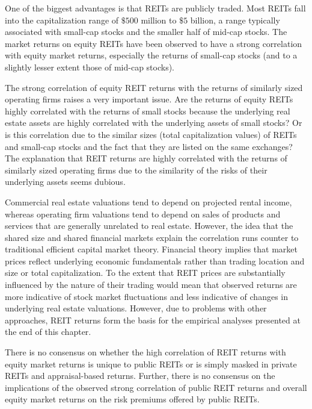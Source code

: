 \documentclass[11pt]{article}
\begin{document}
One of the biggest advantages is that REITs are publicly traded. Most REITs fall into the capitalization range of $\$ 500$ million to $\$ 5$ billion, a range typically associated with small-cap stocks and the smaller half of mid-cap stocks. The market returns on equity REITs have been observed to have a strong correlation with equity market returns, especially the returns of small-cap stocks (and to a slightly lesser extent those of mid-cap stocks).

The strong correlation of equity REIT returns with the returns of similarly sized operating firms raises a very important issue. Are the returns of equity REITs highly correlated with the returns of small stocks because the underlying real estate assets are highly correlated with the underlying assets of small stocks? Or is this correlation due to the similar sizes (total capitalization values) of REITs and small-cap stocks and the fact that they are listed on the same exchanges? The explanation that REIT returns are highly correlated with the returns of similarly sized operating firms due to the similarity of the risks of their underlying assets seems dubious.

Commercial real estate valuations tend to depend on projected rental income, whereas operating firm valuations tend to depend on sales of products and services that are generally unrelated to real estate. However, the idea that the shared size and shared financial markets explain the correlation runs counter to traditional efficient capital market theory. Financial theory implies that market prices reflect underlying economic fundamentals rather than trading location and size or total capitalization. To the extent that REIT prices are substantially influenced by the nature of their trading would mean that observed returns are more indicative of stock market fluctuations and less indicative of changes in underlying real estate valuations. However, due to problems with other approaches, REIT returns form the basis for the empirical analyses presented at the end of this chapter.

There is no consensus on whether the high correlation of REIT returns with equity market returns is unique to public REITs or is simply masked in private REITs and appraisal-based returns. Further, there is no consensus on the implications of the observed strong correlation of public REIT returns and overall equity market returns on the risk premiums offered by public REITs.
\end{document}
